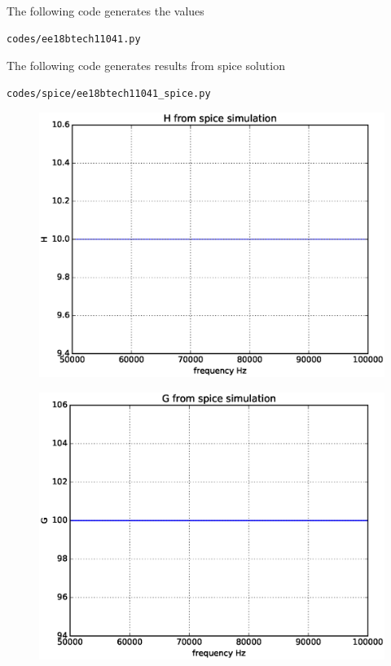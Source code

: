 \begin{enumerate}[label=\arabic*.,ref=\theenumi]
    
The following code generates the values
\begin{lstlisting}
codes/ee18btech11041.py
\end{lstlisting}

The following code generates results from spice solution

\begin{lstlisting}
codes/spice/ee18btech11041_spice.py
\end{lstlisting}

\begin{figure}[!ht]
\centering
\includegraphics[width=\columnwidth]{./figs/H1.eps}
\caption{}
\label{fig:fig8}
\end{figure}


\begin{figure}[!ht]
\centering
\includegraphics[width=\columnwidth]{./figs/G1.eps}
\caption{}
\label{fig:fig9}
\end{figure}



\end{enumerate}
